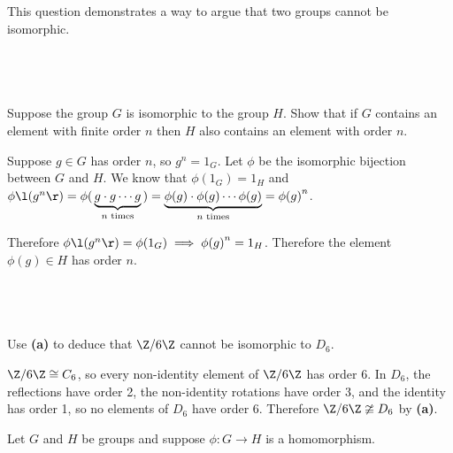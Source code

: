 \documentclass[a4paper]{article}
\begin{document}
\renewcommand{\thesubsection}{Q\arabic{section}~(\alph{subsection})}

\begin{questionbody}
This question demonstrates a way to argue that two groups cannot be isomorphic.
\end{questionbody}

\subsection{~} %

\begin{questionbody}
Suppose the group $G$ is isomorphic to the group $H$. Show that if $G$ contains an element with finite order $n$ then $H$ also contains an element with order $n$.
\end{questionbody}

Suppose $g \in G$ has order $n$, so $g^n = 1_G$. Let $\phi$ be the isomorphic bijection between $G$ and $H$. We know that $\phi(1_G) = 1_H$ and $\phi\l(g^n\r) = \phi(\, \underbrace{g \cdot g \cdots g}_{n \text{ times}} \,) = \underbrace{\phi(g) \cdot \phi(g) \cdots \phi(g)}_{n \text{ times}} = {\phi(g)}^n$.

Therefore $\phi\l( g^n \r) = \phi(1_G) \implies {\phi(g)}^n = 1_H$. Therefore the element $\phi(g) \in H$ has order $n$.

\subsection{~} %

\begin{questionbody}
Use \textbf{(a)} to deduce that $\Z / 6\Z$ cannot be isomorphic to $D_6$.
\end{questionbody}

$\Z / 6\Z \cong C_6$, so every non-identity element of $\Z / 6\Z$ has order 6. In $D_6$, the reflections have order 2, the non-identity rotations have order 3, and the identity has order 1, so no elements of $D_6$ have order 6. Therefore $\Z / 6\Z \ncong D_6$ by \textbf{(a)}.


\begin{questionbody}
Let $G$ and $H$ be groups and suppose $\phi : G \to H$ is a homomorphism.
\end{questionbody}

\subsection{~} %
\end{document}
